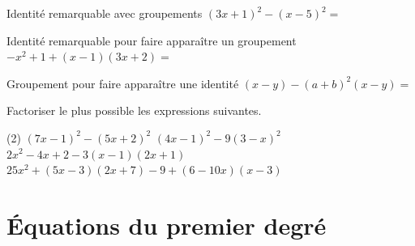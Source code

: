 \documentclass[a4paper,12pt]{article}
\begin{document}
\begin{exemple}Identité remarquable avec groupements
	\tcblower
	$(3x+1)^2-(x-5)^2=$
	\vspace{5.8cm}	

\end{exemple}

\begin{exemple}
	 Identité remarquable pour faire apparaître un groupement
	\tcblower
	$-x^2+1+(x-1)(3x+2)=$
	\vspace{7.8cm}	

\end{exemple}

\begin{exemple}
	Groupement pour faire apparaître une identité
	\tcblower
	$(x-y)-(a+b)^2(x-y)=$
	\vspace{6cm}	

\end{exemple}

\begin{exercice}
	\tcblower
Factoriser le plus possible les expressions suivantes.
  \begin{tasks}(2)
  	\task $(7x-1)^2-(5x+2)^2$
	\task $(4x-1)^2-9(3-x)^2$
	\task* $2x^2-4x+2-3(x-1)(2x+1)$
	\task* $25x^2+(5x-3)(2x+7)-9+(6-10x)(x-3)$
  \end{tasks}
\end{exercice}

\section{Équations du premier degré}
\end{document}

